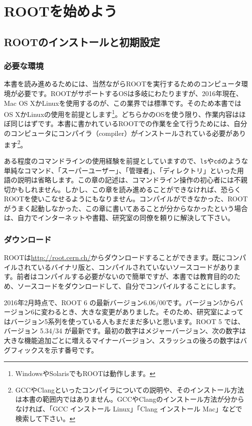 \chapter{ROOTを始めよう}
\label{chapter_Install}
\section{ROOTのインストールと初期設定}
\label{sec_ROOT_install}
\subsection{必要な環境}
本書を読み進めるためには、当然ながらROOTを実行するためのコンピュータ環境が必要です。ROOTがサポートするOSは多岐にわたりますが、2016年現在、Mac OS XかLinuxを使用するのが、この業界では標準です。そのため本書ではOS XかLinuxの使用を前提とします\footnote{WindowsやSolarisでもROOTは動作します。}。どちらかのOSを使う限り、作業内容はほぼ同じはずです。本書に書かれているROOTでの作業を全て行うためには、自分のコンピュータにコンパイラ（compiler）がインストールされている必要があります\footnote{GCCやClangといったコンパイラについての説明や、そのインストール方法は本書の範囲内ではありません。GCCやClangのインストール方法が分からなければ、「GCC インストール Linux」「Clang インストール Mac」などで検索して下さい。}。

ある程度のコマンドラインの使用経験を前提としていますので、\texttt{ls}や\texttt{cd}のような単純なコマンド、「スーパーユーザー」、「管理者」、「ディレクトリ」といった用語の説明は省略します。この章の記述は、コマンドライン操作の初心者には不親切かもしれません。しかし、この章を読み進めることができなければ、恐らくROOTを使いこなせるようにもなりません。コンパイルができなかった、ROOTがうまく起動しなかった、この章に書いてあることが分からなかったという場合は、自力でインターネットや書籍、研究室の同僚を頼りに解決して下さい。

\subsection{ダウンロード}
\label{subsec_download}
ROOTは\url{http://root.cern.ch/}からダウンロードすることができます。既にコンパイルされているバイナリ版と、コンパイルされていないソースコードがあります。前者はコンパイルする必要がないので簡単ですが、本書では教育目的のため、ソースコードをダウンロードして、自分でコンパイルすることにします。

2016年2月時点で、ROOT 6 の最新バージョン6.06/00です。バージョン5からバージョン6に変わるとき、大きな変更がありました。そのため、研究室によってはバージョン5系列を使っている人もまだまだ多いと思います。ROOT 5 では、バージョン 5.34/34 が最新です。最初の数字はメジャーバージョン、次の数字は大きな機能追加ごとに増えるマイナーバージョン、スラッシュの後ろの数字はバグフィックスを示す番号です。

